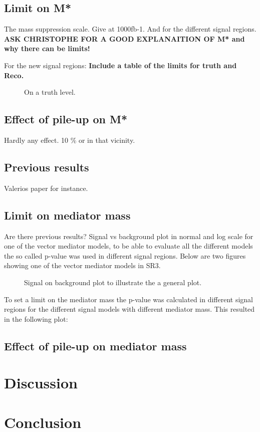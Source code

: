 \subsection{Limit on M*}
The mass suppression scale.
Give at 1000fb-1. And for the different signal regions.
\textbf{ASK CHRISTOPHE FOR A GOOD EXPLANAITION OF M* and why there can be limits!}

For the new signal regions: \textbf{Include a table of the limits for truth and Reco.}
 \begin{figure}[H] %
    \hfill
    \caption{On a truth level.}
    \label{fig:SRnewM}
  \end{figure}

\subsection{Effect of pile-up on M*}
Hardly any effect. 10 \% or in that vicinity.

\subsection{Previous results}
Valerios paper for instance.
\subsection{Limit on mediator mass}
Are there previous results?
Signal vs background plot in normal and log scale for one of the vector mediator models, to be able to evaluate all the different models the so called p-value was used in different signal regions. Below are two figures showing one of the vector mediator models in SR3.
 \begin{figure}[H] %
    \hfill
    \caption{Signal on background plot to illustrate the a general plot. }
    \label{fig:sigback}
  \end{figure}

To set a limit on the mediator mass the p-value was calculated in different signal regions for the different signal models with different mediator mass. This resulted in the following plot:


\subsection{Effect of pile-up on mediator mass}
\section{Discussion}
\section{Conclusion}